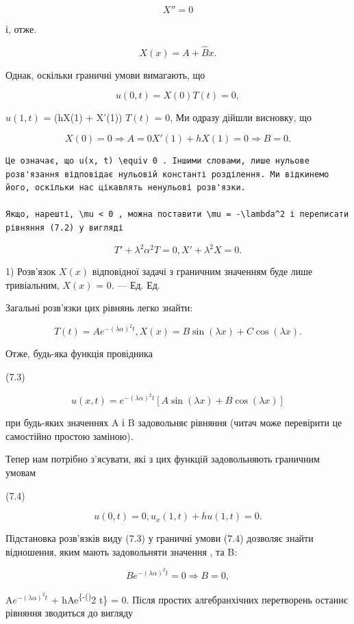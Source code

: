 \documentclass[
  ukrainian,
]{article}
\begin{document}
\[
X'' = 0
\]

і, отже.

\[
X(x) = A + \hat{B}x.
\]

Однак, оскільки граничні умови вимагають, що

\[
u(0, t) = X(0) T(t) = 0,
\]

\(u(1, t)\) = (hX(1) + X'(1)) \(T(t)\) = 0, Ми одразу дійшли висновку,
що

\[
X(0) = 0
\Rightarrow A = 0 X'(1) + hX(1) = 0 \Rightarrow B = 0 .
\]

\begin{verbatim}
Це означає, що u(x, t) \equiv 0 . Іншими словами, лише нульове розв'язання відповідає нульовій константі розділення. Ми відкинемо його, оскільки нас цікавлять ненульові розв'язки.

Якщо, нарешті, \mu < 0 , можна поставити \mu = -\lambda^2 і переписати рівняння (7.2) у вигляді
\end{verbatim}

\[
T' + \lambda^2 \alpha^2 T = 0,
X' + \lambda^2 X = 0.
\]

1) Розв'язок \(X(x)\) відповідної задачі з граничним значенням буде лише
тривіальним, \(X(x)\) = 0. --- Ед. Ед.

Загальні розв'язки цих рівнянь легко знайти:

\[
T(t) = Ae^{-(\lambda \alpha)^2 t},
X(x) = B\sin(\lambda x) + C\cos(\lambda x).
\]

Отже, будь-яка функція провідника

(7.3)

\[
u(x, t) = e^{-(\lambda \alpha)^2 t} [A \sin(\lambda x) + B \cos(\lambda x)]
\]

при будь-яких значеннях \lambda A і B задовольняє рівняння (читач може
перевірити це самостійно простою заміною).

Тепер нам потрібно з'ясувати, які з цих функцій задовольняють граничним
умовам

(7.4)

\[
u(0, t) = 0, u_x(1, t) + hu(1, t) = 0.
\]

Підстановка розв'язків виду (7.3) у граничні умови (7.4) дозволяє знайти
відношення, яким мають задовольняти значення \lambda , \Lambda та B:

\[
Be^{-(\lambda\alpha)^2 t} = 0 \Rightarrow B = 0,
\]

A\lambda \(e^{-(\lambda\alpha)^2 t}\) \cos \lambda +
hAe\textsuperscript{\{-(\lambda\alpha)}2 t\} \sin \lambda = 0. Після
простих алгебранхічних перетворень останнє рівняння зводиться до вигляду
\end{document}
